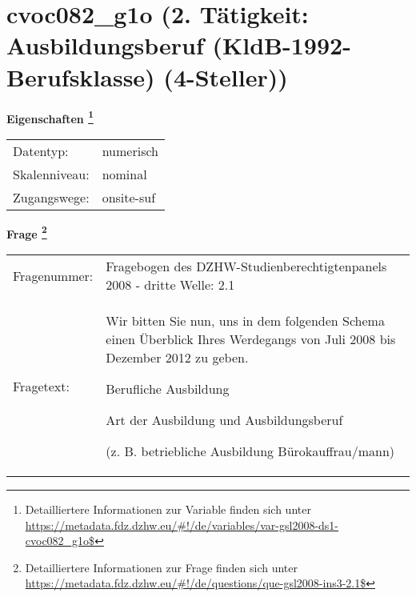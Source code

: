 
    \setcounter{footnote}{0}

    \vspace*{-1.8cm}
	\section{cvoc082\_g1o (2. Tätigkeit: Ausbildungsberuf (KldB-1992-Berufsklasse) (4-Steller))}
	\label{section:cvoc082_g1o}



    \vspace*{0.5cm}
    \noindent\textbf{Eigenschaften
	\footnote{Detailliertere Informationen zur Variable finden sich unter
		\url{https://metadata.fdz.dzhw.eu/\#!/de/variables/var-gsl2008-ds1-cvoc082_g1o$}}}\\
	\begin{tabularx}{\hsize}{@{}lX}
	Datentyp: & numerisch \\
	Skalenniveau: & nominal \\
	Zugangswege: &
	  onsite-suf
 \\
    \end{tabularx}



				\vspace*{0.5cm}
                \noindent\textbf{Frage
	                \footnote{Detailliertere Informationen zur Frage finden sich unter
		              \url{https://metadata.fdz.dzhw.eu/\#!/de/questions/que-gsl2008-ins3-2.1$}}}\\
				\begin{tabularx}{\hsize}{@{}lX}
					Fragenummer: &
					  Fragebogen des DZHW-Studienberechtigtenpanels 2008 - dritte Welle:
					  2.1
 \\
					Fragetext: & Wir bitten Sie nun, uns in dem folgenden Schema einen Überblick Ihres Werdegangs von Juli 2008 bis Dezember 2012 zu geben.\par  Berufliche Ausbildung\par  Art der Ausbildung und Ausbildungsberuf\par  (z. B. betriebliche Ausbildung Bürokauffrau/mann) \\
				\end{tabularx}





